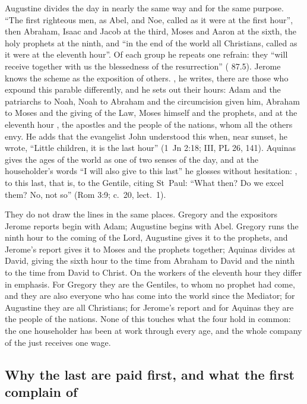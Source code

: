 Augustine divides the day in nearly the same way and for the same purpose.
``The first righteous men, as Abel, and Noe, called as it were at the first
hour'', then Abraham, Isaac and Jacob at the third, Moses and Aaron at the
sixth, the holy prophets at the ninth, and ``in the end of the world all
Christians, called as it were at the eleventh hour''. Of each group he repeats
one refrain: they ``will receive together with us the blessedness of the
resurrection'' ( 87.5). Jerome knows the scheme as the exposition of
others. , he writes, there
are those who expound this parable differently, and he sets out their hours:
Adam and the patriarchs to Noah, Noah to Abraham and the circumcision given
him, Abraham to Moses and the giving of the Law, Moses himself and the
prophets, and at the eleventh hour , the apostles and the people of the nations, whom all the
others envy. He adds that the evangelist John understood this when, near
sunset, he wrote, ``Little children, it is the last hour'' (1~Jn 2:18;
 III, PL 26, 141). Aquinas gives the ages of
the world as one of two senses of the day, and at the householder's words ``I
will also give to this last'' he glosses without hesitation: , to this last, that is, to the Gentile, citing
St~Paul: ``What then? Do we excel them? No, not so'' (Rom 3:9;  c.~20, lect.~1).

They do not draw the lines in the same places. Gregory and the expositors
Jerome reports begin with Adam; Augustine begins with Abel. Gregory runs the
ninth hour to the coming of the Lord, Augustine gives it to the prophets, and
Jerome's report gives it to Moses and the prophets together; Aquinas divides
at David, giving the sixth hour to the time from Abraham to David and the
ninth to the time from David to Christ. On the workers of
the eleventh hour they differ in emphasis. For Gregory they are the Gentiles,
to whom no prophet had come, and they are also everyone who has come into the
world since the Mediator; for Augustine they are all Christians; for Jerome's
report and for Aquinas they are the people of the nations. None of this
touches what the four hold in common: the one householder has been at work
through every age, and the whole company of the just receives one wage.

\subsection{Why the last are paid first, and what the first complain of}

